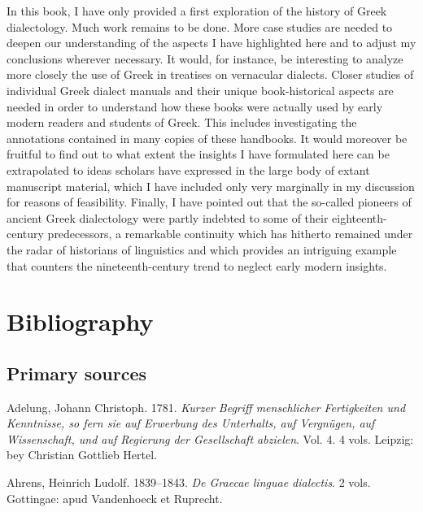 \begin{styleStandard}
In this book, I have only provided a first exploration of the history of Greek dialectology. Much work remains to be done. More case studies are needed to deepen our understanding of the aspects I have highlighted here and to adjust my conclusions wherever necessary. It would, for instance, be interesting to analyze more closely the use of Greek in treatises on vernacular dialects. Closer studies of individual Greek dialect manuals and their unique book-historical aspects are needed in order to understand how these books were actually used by early modern readers and students of Greek. This includes investigating the annotations contained in many copies of these handbooks. It would moreover be fruitful to find out to what extent the insights I have formulated here can be extrapolated to ideas scholars have expressed in the large body of extant manuscript material, which I have included only very marginally in my discussion for reasons of feasibility. Finally, I have pointed out that the so-called pioneers of ancient Greek dialectology were partly indebted to some of their eighteenth-century predecessors, a remarkable continuity which has hitherto remained under the radar of historians of linguistics and which provides an intriguing example that counters the nineteenth-century trend to neglect early modern insights.
\end{styleStandard}

\clearpage\section{Bibliography}
\hypertarget{Toc19704870}{}\subsection{Primary sources}
\hypertarget{Toc19704871}{}\begin{styleStandard}
Adelung, Johann Christoph. 1781. \textit{Kurzer Begriff menschlicher Fertigkeiten und Kenntnisse, so fern sie auf Erwerbung des Unterhalts, auf Vergnügen, auf Wissenschaft, und auf Regierung der Gesellschaft abzielen}. Vol. 4. 4 vols. Leipzig: bey Christian Gottlieb Hertel.
\end{styleStandard}

\begin{styleStandard}
Ahrens, Heinrich Ludolf. 1839–1843. \textit{De Graecae linguae dialectis}. 2 vols. Gottingae: apud Vandenhoeck et Ruprecht.
\end{styleStandard}

